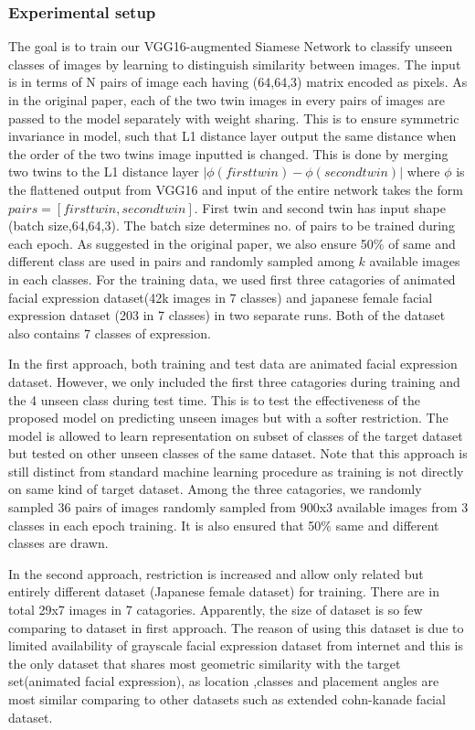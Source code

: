 \documentclass{article}
\begin{document}
\subsubsection{\textbf{Experimental setup}}

The goal is to train our VGG16-augmented Siamese Network to classify unseen classes of images by learning to distinguish similarity between images. The input is in terms of N pairs of image each having (64,64,3) matrix encoded as pixels. As in the original paper, each of the two twin images in every pairs of images are passed to the model separately with weight sharing. This is to ensure symmetric invariance in model, such that L1 distance layer output the same distance when the order of the two twins image inputted is changed. This is done by merging two twins to the L1 distance layer $|\phi(first twin) - \phi(second twin)|$ where $\phi$ is the flattened output from VGG16 and input of the entire network takes the form $pairs = [first twin,second twin]$. First twin and second twin has input shape (batch size,64,64,3). The batch size determines no. of pairs to be trained during each epoch. As suggested in the original paper, we also ensure 50$\%$ of same and different class are used in pairs and randomly sampled among $k$ available images in each classes. For the training data, we used first three catagories of animated facial expression dataset(42k images in 7 classes) and japanese female facial expression dataset (203 in 7 classes) in two separate runs. Both of the dataset also contains 7 classes of expression.

In the first approach, both training and test data are animated facial expression dataset. However, we only included the first three catagories during training and the 4 unseen class during test time. This is to test the effectiveness of the proposed model on predicting unseen images but with a softer restriction. The model is allowed to learn representation on subset of classes of the target dataset but tested on other unseen classes of the same dataset. Note that this approach is still distinct from standard machine learning procedure as training is not directly on same kind of target dataset. Among the three catagories, we randomly sampled 36 pairs of images randomly sampled from 900x3 available images from 3 classes in each epoch training. It is also ensured that 50$\%$ same and different classes are drawn.

In the second approach, restriction is increased and allow only related but entirely different dataset (Japanese female dataset) for 
training. There are in total 29x7 images in 7 catagories. Apparently, the size of dataset is so few comparing to dataset in first
approach. The reason of using this dataset is due to limited availability of grayscale facial expression dataset from internet and this is the only dataset that shares most geometric similarity with the target set(animated facial expression), as location ,classes and placement angles are most similar comparing to other datasets such as extended cohn-kanade facial dataset.
\end{document}
